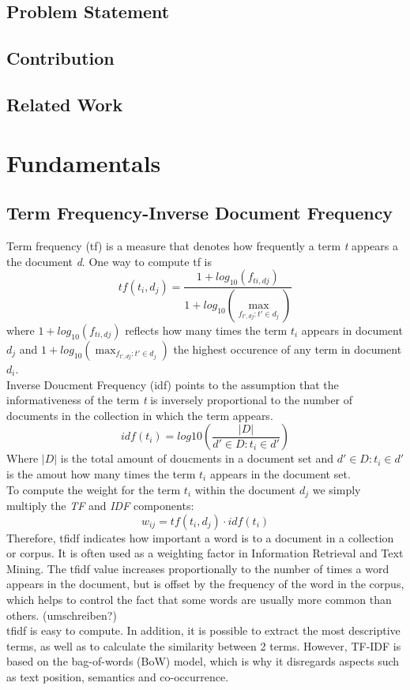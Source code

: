 \documentclass[a4paper, 11pt,titlepage,oneside,openany]{book}
\begin{document}
\section{Problem Statement}
 
 

\section{Contribution}

 

\section{Related Work}

\chapter{Fundamentals}

\section{Term Frequency-Inverse Document Frequency}
Term frequency (\gls{tf}) is a measure that denotes how frequently a term \textit{t} appears a the document \textit{d}. One way to compute \gls{tf} is \\
\[
tf(t_i, d_j)=\frac{1+log_{10}(f_{ti,dj})}{1+log_{10}(\max_{f_{t', dj}:t'\in d_j})}
\]
where $1+log_{10}(f_{ti,dj})$ reflects how many times the term $t_i$ appears in document $d_j$ and $1+log_{10}(\max_{f_{t', dj}:t'\in d_j})$ the highest occurence of any term in document $d_i$.\\

\noindent Inverse Doucment Frequency (\gls{idf}) points to the assumption that the informativeness of the term \textit{t} is inversely proportional to the number of documents in the collection in which the term appears.\\
\[
idf(t_i)=log{10}(\frac{|D|}{d' \in D : t_i \in d'})
\]
Where $|D|$ is the total amount of doucments in a document set and $d' \in D : t_i \in d'$ is the amout how many times the term $t_i$ appears in the document set.\\

\noindent To compute the weight for the term $t_i$ within the document $d_j$ we simply multiply the \textit{TF} and \textit{IDF} components:
\[
w_{ij}=tf(t_i, d_j)\cdot idf(t_i)
\]
Therefore, \Gls{tfidf} indicates how important a word is to a document in a collection or corpus. It is often used as a weighting factor in Information Retrieval and Text Mining. The \Gls{tfidf} value increases proportionally to the number of times a word appears in the document, but is offset by the frequency of the word in the corpus, which helps to control the fact that some words are usually more common than others. (umschreiben?) \\
\noindent \Gls{tfidf} is easy to compute. In addition, it is possible to extract the most descriptive terms, as well as to calculate the similarity between 2 terms. However, TF-IDF is based on the bag-of-words (BoW) model, which is why it disregards aspects such as text position, semantics and co-occurrence.
\end{document}
